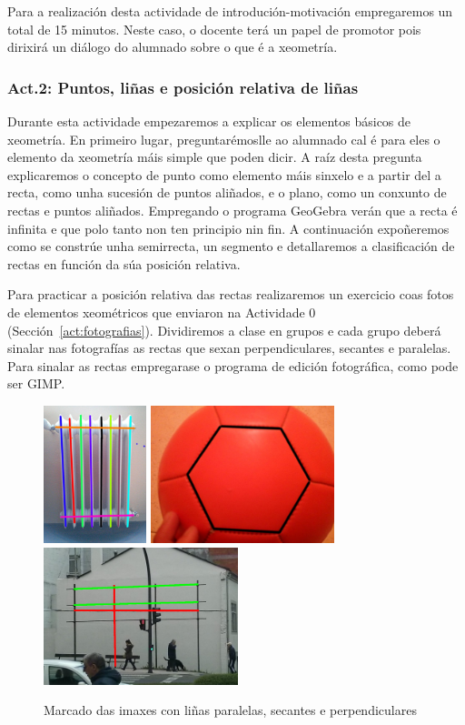 Para a realización desta actividade de introdución-motivación empregaremos un total de 15 minutos. Neste caso, o docente terá un papel de promotor pois dirixirá un diálogo do alumnado sobre o que é a xeometría.

\subsubsection{Act.2: Puntos, liñas e posición relativa de liñas}\label{act:rectas}
Durante esta actividade empezaremos a explicar os elementos básicos de xeometría. En primeiro lugar, preguntarémoslle ao alumnado cal é para eles o elemento da xeometría máis simple que poden dicir. A raíz desta pregunta explicaremos o concepto de punto como elemento máis sinxelo e a partir del a recta, como unha sucesión de puntos aliñados, e o plano, como un conxunto de rectas e puntos aliñados. Empregando o programa GeoGebra verán que a recta é infinita e que polo tanto non ten principio nin fin. A continuación expoñeremos como se constrúe unha semirrecta, un segmento e detallaremos a clasificación de rectas en función da súa posición relativa.

Para practicar a posición relativa das rectas realizaremos un exercicio coas fotos de elementos xeométricos que enviaron na Actividade 0 (Sección~\ref{act:fotografias}). Dividiremos a clase en grupos e cada grupo deberá sinalar nas fotografías as rectas que sexan perpendiculares, secantes e paralelas. Para sinalar as rectas empregarase o programa de edición fotográfica, como pode ser GIMP.

\begin{figure}[h!]
  \centering
  \includegraphics[height=4cm]{img/act1-img.jpg}
  \includegraphics[height=4cm]{img/act1-img2.jpg}
  \includegraphics[height=4cm]{img/act1-img3.jpg}
  \caption{Marcado das imaxes con liñas paralelas, secantes e perpendiculares}\label{fig:act2}
\end{figure}

